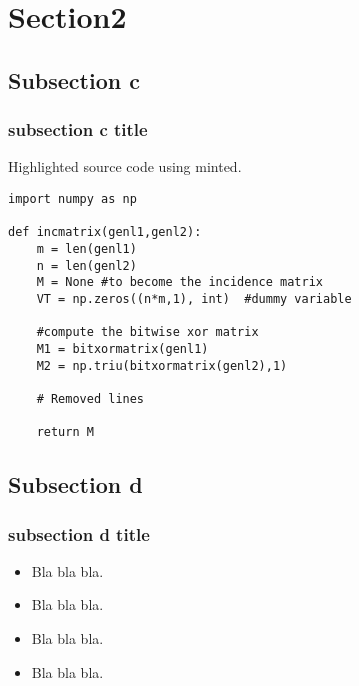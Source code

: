 \section{Section2}
%
\subsection{Subsection c}
\begin{frame}[label=sectionc, t, fragile]
\frametitle{subsection c title} 

Highlighted source code using minted.


\begin{verbatim}
import numpy as np

def incmatrix(genl1,genl2):
    m = len(genl1)
    n = len(genl2)
    M = None #to become the incidence matrix
    VT = np.zeros((n*m,1), int)  #dummy variable

    #compute the bitwise xor matrix
    M1 = bitxormatrix(genl1)
    M2 = np.triu(bitxormatrix(genl2),1)

    # Removed lines

    return M
\end{verbatim}

\end{frame}


%
\subsection{Subsection d}
\begin{frame}[label=sectiond]
\frametitle{subsection d title} 
\begin{itemize}
\item Bla bla bla.
\item Bla bla bla.
\item Bla bla bla.
\item Bla bla bla.
\end{itemize}
\end{frame}
